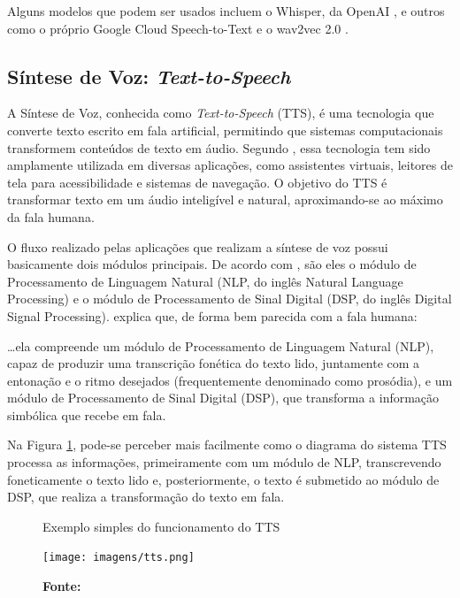 Alguns modelos que podem ser usados incluem o Whisper, da OpenAI \cite{radford2023}, e outros como o próprio Google Cloud Speech-to-Text e o wav2vec 2.0 \cite{Baevski2020}.

\subsection{Síntese de Voz: \textit{Text-to-Speech}}

A Síntese de Voz, conhecida como \textit{Text-to-Speech} (TTS), é uma tecnologia que converte texto escrito em fala artificial, permitindo que sistemas computacionais transformem conteúdos de texto em áudio. Segundo , essa tecnologia tem sido amplamente utilizada em diversas aplicações, como assistentes virtuais, leitores de tela para acessibilidade e sistemas de navegação. O objetivo do TTS é transformar texto em um áudio inteligível e natural, aproximando-se ao máximo da fala humana.

O fluxo realizado pelas aplicações que realizam a síntese de voz possui basicamente dois módulos principais. De acordo com , são eles o módulo de Processamento de Linguagem Natural (NLP, do inglês Natural Language Processing) e o módulo de Processamento de Sinal Digital (DSP, do inglês Digital Signal Processing).  explica que, de forma bem parecida com a fala humana:

\begin{citacao}
    …ela compreende um módulo de Processamento de Linguagem Natural (NLP), capaz de produzir uma transcrição fonética do texto lido, juntamente com a entonação e o ritmo desejados (frequentemente denominado como prosódia), e um módulo de Processamento de Sinal Digital (DSP), que transforma a informação simbólica que recebe em fala.
\end{citacao}

Na Figura \ref{fig:5}, pode-se perceber mais facilmente como o diagrama do sistema TTS processa as informações, primeiramente com um módulo de NLP, transcrevendo foneticamente o texto lido e, posteriormente, o texto é submetido ao módulo de DSP, que realiza a transformação do texto em fala.

\begin{figure}[!h]
     \caption{Exemplo simples do funcionamento do TTS}
     \centering
     \texttt{[image: imagens/tts.png]}
     \label{fig:5}
     \caption*{\textbf{Fonte:} }
\end{figure}

